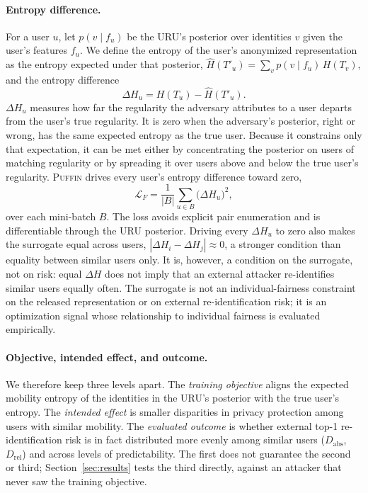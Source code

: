\documentclass[sigconf,anonymous,review]{acmart}
\newcommand{\puffin}{\textsc{Puffin}}
\begin{document}
\paragraph{Entropy difference.} For a user $u$, let $p(v\mid f_u)$ be the URU's posterior over identities $v$ given the user's features $f_u$. We define the entropy of the user's anonymized representation as the entropy expected under that posterior, $\hat H(T'_u)=\sum_v p(v\mid f_u)\,H(T_v)$, and the entropy difference
\begin{equation}
\Delta H_u = H(T_u) - \hat H(T'_u).
\end{equation}
$\Delta H_u$ measures how far the regularity the adversary attributes to a user departs from the user's true regularity. It is zero when the adversary's posterior, right or wrong, has the same expected entropy as the true user. Because it constrains only that expectation, it can be met either by concentrating the posterior on users of matching regularity or by spreading it over users above and below the true user's regularity. \puffin{} drives every user's entropy difference toward zero,
\begin{equation}
\mathcal{L}_F = \frac{1}{|B|}\sum_{u\in B} \big(\Delta H_u\big)^2 ,
\end{equation}
over each mini-batch $B$. The loss avoids explicit pair enumeration and is differentiable through the URU posterior. Driving every $\Delta H_u$ to zero also makes the surrogate equal across users, $|\Delta H_i-\Delta H_j|\approx 0$, a stronger condition than equality between similar users only. It is, however, a condition on the surrogate, not on risk: equal $\Delta H$ does not imply that an external attacker re-identifies similar users equally often. The surrogate is not an individual-fairness constraint on the released representation or on external re-identification risk; it is an optimization signal whose relationship to individual fairness is evaluated empirically.

\paragraph{Objective, intended effect, and outcome.} We therefore keep three levels apart. The \emph{training objective} aligns the expected mobility entropy of the identities in the URU's posterior with the true user's entropy. The \emph{intended effect} is smaller disparities in privacy protection among users with similar mobility. The \emph{evaluated outcome} is whether external top-1 re-identification risk is in fact distributed more evenly among similar users ($D_{\mathrm{abs}}$, $D_{\mathrm{rel}}$) and across levels of predictability. The first does not guarantee the second or third; Section~\ref{sec:results} tests the third directly, against an attacker that never saw the training objective.
\end{document}
